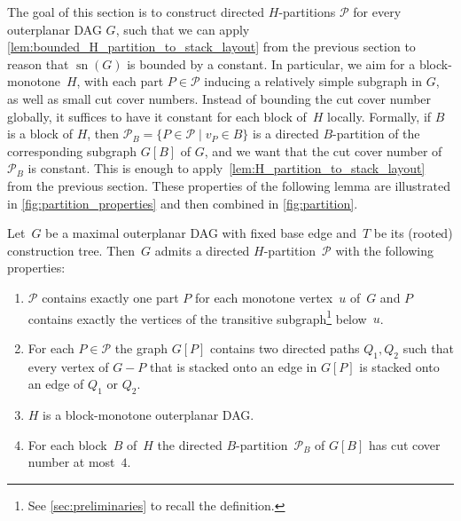 \documentclass{theoretics}
\DeclareMathOperator{\sn}{sn}
\newcommand{\calP}{\ensuremath{\mathcal{P}}\xspace}
\newcommand{\Hpartition}{$H$\nobreakdash-partition\xspace}
\begin{document}
The goal of this section is to construct directed \Hpartition{}s $\calP$ for every outerplanar DAG $G$, such that we can apply \cref{lem:bounded_H_partition_to_stack_layout} from the previous section to reason that $\sn(G)$ is bounded by a constant.
In particular, we aim for a block-monotone~$H$, with each part $P \in \calP$ inducing a relatively simple subgraph in $G$, as well as small cut cover numbers.
Instead of bounding the cut cover number globally, it suffices to have it constant for each block of~$H$ locally.
Formally, if $B$ is a block of $H$, then $\calP_B = \{P \in \calP \mid v_P \in B\}$ is a directed $B$-partition of the corresponding subgraph $G[B]$ of $G$, and we want that the cut cover number of $\calP_B$ is constant.
This is enough to apply~\cref{lem:H_partition_to_stack_layout} from the previous section.
These properties of the following lemma are illustrated in \cref{fig:partition_properties} and then combined in \cref{fig:partition}.

\begin{lemma}
    \label{lem:construct_H_partition}
    Let~$G$ be a maximal outerplanar DAG with fixed base edge and~$T$ be its (rooted) construction tree.
    Then~$G$ admits a directed \Hpartition~$\calP$ with the following properties:
    \begin{enumerate}[(P1)]
        \item\label{prop:parts_maximal_transitive_subgraphs}
        $\calP$ contains exactly one part $P$ for each monotone vertex~$u$ of~$G$ and $P$ contains exactly the vertices of the transitive subgraph\footnote{See \cref{sec:preliminaries} to recall the definition.} below~$u$.
        \item\label{prop:two_paths}
        For each $P \in \calP$ the graph $G[P]$ contains two directed paths $Q_1,Q_2$ such that every vertex of $G - P$ that is stacked onto an edge in $G[P]$ is stacked onto an edge of $Q_1$ or $Q_2$.
        \item\label{prop:H_block_monotone}
        $H$ is a block-monotone outerplanar DAG.
        \item\label{prop:block_cut_cover_number_bounded}
        For each block~$B$ of~$H$ the directed $B$-partition~$\calP_B$ of $G[B]$ has cut cover number at most~$4$.
    \end{enumerate}
\end{lemma}
\end{document}
